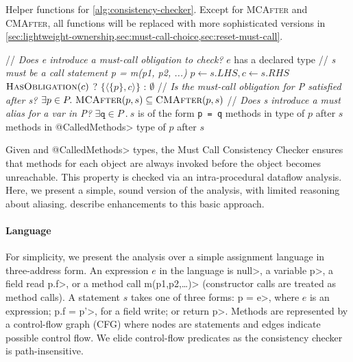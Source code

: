 \begin{algorithm}[h]
  \caption{Helper functions for \cref{alg:consistency-checker}.  Except for
  \textsc{MCAfter} and \textsc{CMAfter}, all functions will be replaced with
  more sophisticated versions in
  \cref{sec:lightweight-ownership,sec:must-call-choice,sec:reset-must-call}.
}
  \label{alg:helpers}
  \begin{algorithmic}[1]
  \State // \textit{Does e introduce a must-call obligation to check?}
  \State \Return $e$ has a declared \MustCall type
  \EndProcedure
  \State // \textit{s must be a call statement p = m(p1, p2, ...)}
  \State $p \gets s.LHS, c \gets s.RHS$
  \State \Return $\textsc{HasObligation}(c)$ ? $\{ \langle \{ p \}, c
  \rangle \}$ : $\emptyset$
  \EndProcedure
  \State // \textit{Is the must-call obligation for P satisfied after
    s?}
  \State \Return $\exists p \in P .\ \textsc{MCAfter}(p,s) \subseteq \textsc{CMAfter}(p,s)$
  \EndProcedure
  \State // \textit{Does s introduce a must alias for a var in P?}
    \State \Return $\exists \mathtt{q} \in P\ .\ s$ is of the form \texttt{p = q}
  \EndProcedure
  \State \Return methods in \MustCall type of $p$ after $s$
  \EndProcedure
  \State \Return methods in \<@CalledMethods> type of $p$ after $s$
  \EndProcedure
  \end{algorithmic}

\end{algorithm}

Given \MustCall and \<@CalledMethods> types, the Must
Call Consistency Checker ensures that \MustCall methods for each object
are always invoked before the object becomes unreachable.  This property is
checked via an intra-procedural dataflow analysis.  Here, we present
a simple, sound version of the analysis, with limited reasoning about aliasing.
describe enhancements to this basic approach.

\paragraph{Language} For simplicity, we present the analysis over a simple
assignment language in three-address form.  An expression $e$ in the language is
\<null>, a variable \<p>, a field read \<p.f>, or a method call \<m(p1,p2,\ldots)> (constructor
calls are treated as method calls).  A statement $s$ takes one of three forms:
\<p = e>, where $e$ is an expression; \<p.f = p'>, for a field write; or
\<return p>.  Methods are represented by a control-flow graph (CFG) where nodes
are statements and edges indicate possible control flow.  We elide control-flow
predicates as the consistency checker is path-insensitive.

